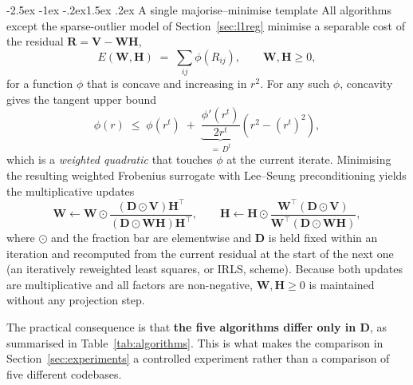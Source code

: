\documentclass[12pt,a4paper]{article}
\makeatletter
\renewcommand\subsection{\@startsection{subsection}{2}{\z@}%
    {-2.5ex \@plus -1ex \@minus -.2ex}{1.5ex \@plus.2ex}%
    {\normalfont\fontsize{12}{14}\bfseries}}
\newcommand{\bV}{\bm{V}}
\newcommand{\bW}{\bm{W}}
\newcommand{\bH}{\bm{H}}
\newcommand{\bD}{\bm{D}}
\newcommand{\bR}{\bm{R}}
\makeatother
\begin{document}
\subsection{A single majorise--minimise template}
All algorithms except the sparse-outlier model of
Section~\ref{sec:l1reg} minimise a separable cost of the residual
$\bR = \bV - \bW\bH$,
\begin{equation}
  E(\bW,\bH) \;=\; \sum_{ij} \phi\!\left(R_{ij}\right),
  \qquad \bW,\bH \ge 0 ,
  \label{eq:generic}
\end{equation}
for a function $\phi$ that is concave and increasing in $r^2$. For any such
$\phi$, concavity gives the tangent upper bound
\begin{equation}
  \phi(r) \;\le\; \phi(r^{t}) \;+\;
  \underbrace{\frac{\phi'(r^{t})}{2 r^{t}}}_{=\,D^{t}}
  \left(r^{2} - (r^{t})^{2}\right),
  \label{eq:majoriser}
\end{equation}
which is a \emph{weighted quadratic} that touches $\phi$ at the current
iterate. Minimising the resulting weighted Frobenius surrogate with
Lee--Seung preconditioning yields the multiplicative updates
\begin{equation}
  \bW \leftarrow \bW \odot
    \frac{\left(\bD \odot \bV\right)\bH^{\top}}
         {\left(\bD \odot \bW\bH\right)\bH^{\top}},
  \qquad
  \bH \leftarrow \bH \odot
    \frac{\bW^{\top}\left(\bD \odot \bV\right)}
         {\bW^{\top}\left(\bD \odot \bW\bH\right)} ,
  \label{eq:mu}
\end{equation}
where $\odot$ and the fraction bar are elementwise and $\bD$ is held fixed
within an iteration and recomputed from the current residual at the start of
the next one (an iteratively reweighted least squares, or IRLS, scheme).
Because both updates are multiplicative and all factors are non-negative,
$\bW,\bH \ge 0$ is maintained without any projection step.

The practical consequence is that \textbf{the five algorithms differ only in
$\bD$}, as summarised in Table~\ref{tab:algorithms}. This is what makes the
comparison in Section~\ref{sec:experiments} a controlled experiment rather
than a comparison of five different codebases.
\end{document}
